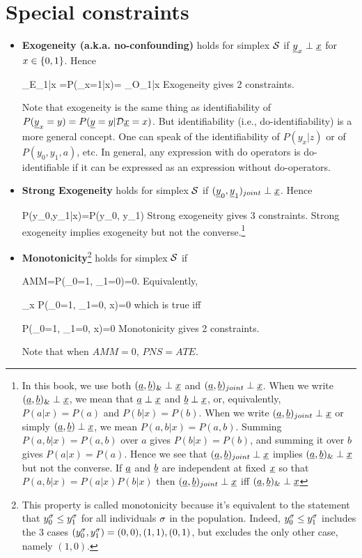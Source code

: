 \section{Special constraints}
\begin{itemize}
\item
{\bf Exogeneity (a.k.a. no-confounding)}
holds for simplex ${\cal S}$
if
${\underline{y}}_x\perp {\underline{x}}$ for $x\in\{0,1\}$.
 Hence

\beq
{}_{E_{1|x}}
=P(\rvy_x=1|x)=
_{O_{1|x}}
\quad {}
\eeq
Exogeneity gives {\color{red}2 constraints}.

Note that exogeneity
is the same thing as identifiability
of $P({\underline{y}}_x=y)=P({\underline{y}}=y|{\cal D}{\underline{x}}=x)$.
But identifiability
(i.e., do-identifiability) is a more
general concept. One can speak
of the identifiability of $P(y_x|z)$
or of $P(y_0, y_1, a)$, etc.
In general,
any expression with
do operators is do-identifiable
if it can be expressed
as an expression without
do-operators.

\item
{\bf Strong Exogeneity} holds
for simplex ${\cal S}$
if $({\underline{y}}_0, {\underline{y}}_1)_{joint}
\perp {\underline{x}}$. Hence

\beq
P(y_0,y_1|x)=P(y_0, y_1)
\label{eq-strong-exogen}
\eeq
Strong exogeneity gives {\color{red} 3 constraints}.
Strong exogeneity implies
exogeneity
but not the converse.\footnote{In
this book, we use both
$({\underline{a}}, {\underline{b}})_\&\perp {\underline{x}}$
and $({\underline{a}}, {\underline{b}})_{joint}\perp {\underline{x}}$.
When we write $({\underline{a}}, {\underline{b}})_\&\perp {\underline{x}}$,
we mean that
${\underline{a}}\perp {\underline{x}}$
and ${\underline{b}}\perp{\underline{x}}$,
or, equivalently,
$P(a|x)=P(a)$
and $P(b|x)=P(b)$.
When we write
$({\underline{a}}, {\underline{b}})_{joint}\perp {\underline{x}}$
or simply $({\underline{a}}, {\underline{b}})\perp {\underline{x}}$,
we mean $P(a,b|x)=P(a,b)$.
Summing
$P(a,b|x)=P(a,b)$
over $a$ gives
$P(b|x)=P(b)$,
and summing it
over $b$ gives
$P(a|x)=P(a)$.
Hence we see that
 $({\underline{a}}, {\underline{b}})_{joint}\perp {\underline{x}}$
implies
$({\underline{a}}, {\underline{b}})_\&\perp {\underline{x}}$
but not the converse.
If ${\underline{a}}$ and ${\underline{b}}$ are independent at
fixed ${\underline{x}}$ so that
$P(a,b|x)=P(a|x)P(b|x)$ then
$({\underline{a}}, {\underline{b}})_{joint}\perp {\underline{x}}$
iff
$({\underline{a}}, {\underline{b}})_\&\perp {\underline{x}}$
}
\item
{\bf Monotonicity}\footnote{
This property is called monotonicity
 because
it's equivalent to the statement
that $y_0^\sigma\leq y_1^\sigma$ for
all individuals $\sigma$
in the population.
Indeed, $y_0^\sigma\leq y_1^\sigma$
includes the 3 cases $(y_0^\sigma, y_1^\sigma)=
(0,0), (1, 1), (0,1)$, but
excludes the only other
case, namely $(1,0)$.}
 holds for simplex ${\cal S}$ if

\beq AMM=P(\rvy_0=1,
 \rvy_1=0)=0\eeq\;.
Equivalently,

\beq
\sum_x P(\rvy_0=1, \rvy_1=0, x)=0
\eeq
which is true iff

\beq
 P(\rvy_0=1, \rvy_1=0, x)=0\quad
{}
\eeq
Monotonicity gives {\color{red} 2
constraints}.

Note that when $AMM=0$, $PNS=ATE$.
\end{itemize}



